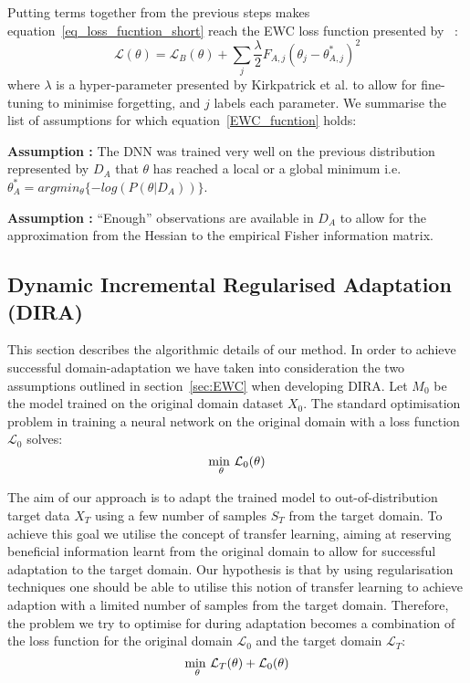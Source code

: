 \noindent Putting terms together from the previous steps makes equation~\ref{eq_loss_fucntion_short} reach the EWC loss function presented by ~\cite{kirkpatrick2017overcoming}: 
\begin{equation}\label{EWC_fucntion}
   \mathcal{L}(\theta) = \mathcal{L}_{B}(\theta) +  \sum_{j}^{} \frac{\lambda}{2} F_{A,j} (\theta_j - \theta^{*}_{A,j})^2
\end{equation}
where $\lambda$ is a hyper-parameter presented by Kirkpatrick et al. to allow for fine-tuning to minimise forgetting, and $j$ labels each parameter.
\noindent We summarise the list of assumptions for which equation~\ref{EWC_fucntion} holds:

\noindent\textbf{Assumption \assumptionEWCfirst:} The DNN was trained very well on the previous distribution represented by $D_A$ that $\theta$ has reached a local or a global minimum i.e. $\theta^{*}_{A} = argmin_{\theta}\{ -log(P(\theta|D_A))\}$. 

\noindent\textbf{Assumption \assumptionEWCsecond:} ``Enough'' observations are available in $D_A$ to allow for the approximation from the Hessian to the empirical Fisher information matrix.

\subsection{Dynamic Incremental Regularised Adaptation (DIRA)}
This section describes the algorithmic details of our method.
%
In order to achieve successful domain-adaptation we have taken into consideration the two assumptions outlined in section~\ref{sec:EWC} when developing DIRA.
%
Let $M_0$ be the model trained on the original domain dataset $X_0$. 
%
The standard optimisation problem in training a neural network on the original domain with a loss function $\mathcal{L}_0$ solves:
\begin{equation}
    \displaystyle{\operatorname*{min\text{ }}_{\theta}} \mathcal{L}_0(\theta)
\end{equation}

The aim of our approach is to adapt the trained model to out-of-distribution target data $X_{T}$ using a few number of samples $S_T$ from the target domain.
%
To achieve this goal we utilise the concept of transfer learning, aiming at reserving beneficial information learnt from the original domain to allow for successful adaptation to the target domain. 
%
Our hypothesis is that by using regularisation techniques one should be able to utilise this notion of transfer learning to achieve adaption with a limited number of samples from the target domain. 
%
Therefore, the problem we try to optimise for during adaptation becomes a combination of the loss function for the original domain $\mathcal{L}_0$ and the target domain $\mathcal{L}_T$: 
\begin{equation}
    \displaystyle{\operatorname*{min\text{ }}_{\theta}} \mathcal{L}_T(\theta) 
+ \mathcal{L}_0(\theta)
\end{equation}

